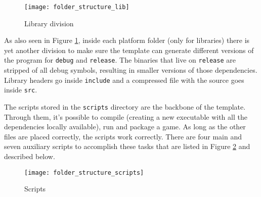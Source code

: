 \begin{figure}[h!]
\centering
\texttt{[image: folder\_structure\_lib]}
\caption{Library division}
\label{fig:folder_structure_lib}
\end{figure}

As also seen in Figure \ref{fig:folder_structure_lib}, inside each platform folder (only for libraries) there is yet another division to make sure the template can generate different versions of the program for \texttt{debug} and \texttt{release}. The binaries that live on \texttt{release} are stripped of all debug symbols, resulting in smaller versions of those dependencies. Library headers go inside \texttt{include} and a compressed file with the source goes inside \texttt{src}.


The scripts stored in the \texttt{scripts} directory are the backbone of the template. Through them, it's possible to compile (creating a new executable with all the dependencies locally available), run and package a game. As long as the other files are placed correctly, the scripts work correctly. There are four main and seven auxiliary scripts to accomplish these tasks that are listed in Figure \ref{fig:folder_structure_scripts} and described below.

\begin{figure}[h!]
\centering
\texttt{[image: folder\_structure\_scripts]}
\caption{Scripts}
\label{fig:folder_structure_scripts}
\end{figure}

